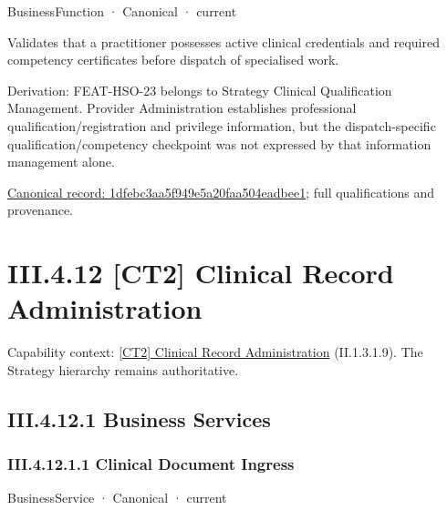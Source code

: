 \label{element:1dfebc3aa5f949e5a20faa504eadbee1}
{\small BusinessFunction · Canonical · current}\par

Validates that a practitioner possesses active clinical credentials and required competency certificates before dispatch of specialised work.



Derivation: FEAT-HSO-23 belongs to Strategy Clinical Qualification Management. Provider Administration establishes professional qualification/registration and privilege information, but the dispatch-specific qualification/competency checkpoint was not expressed by that information management alone.


{\footnotesize \href{../../../../continuum/business/business-function/1dfebc3aa5f949e5a20faa504eadbee1.md}{Canonical record: 1dfebc3aa5f949e5a20faa504eadbee1}; full qualifications and provenance.}\par
\section*{III.4.12 [CT2] Clinical Record Administration}
\label{navigation:III.4.12}

{\small Capability context: \hyperref[element:ce9e7e7b22054cefb707a650d5be7219]{[CT2] Clinical Record Administration} (II.1.3.1.9). The Strategy hierarchy remains authoritative.}\par
\subsection*{III.4.12.1 Business Services}
\label{navigation:III.4.12.1}

\subsubsection*{III.4.12.1.1 Clinical Document Ingress}
\label{navigation:III.4.12.1.1}

\label{element:2a69a33c93954a868249270d919dabfd}
{\small BusinessService · Canonical · current}\par

